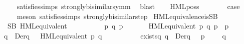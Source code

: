 \begin{isabellebody}
\ \ \ \ \isamarkupfalse%
\ satisfies{\isachardot}{\kern0pt}simps{\isacharparenleft}{\kern0pt}{}{\isacharparenright}{\kern0pt}\ strongly{\isacharunderscore}{\kern0pt}bisimilar{\isacharunderscore}{\kern0pt}symm\ \isamarkupfalse%
\ blast\isanewline
{}\isamarkupfalse%
\isanewline
\ \ \isamarkupfalse%
\ {\isacharparenleft}{\kern0pt}HML{\isacharunderscore}{\kern0pt}poss\ {\isasymalpha}\ {\isasymphi}{\isacharparenright}{\kern0pt}\isanewline
\ \ \isamarkupfalse%
\ \isamarkupfalse%
\ {\isacharquery}{\kern0pt}case\isanewline
\ \ \ \ \isamarkupfalse%
\ {\isacharparenleft}{\kern0pt}meson\ satisfies{\isachardot}{\kern0pt}simps{\isacharparenleft}{\kern0pt}{}{\isacharparenright}{\kern0pt}\ strongly{\isacharunderscore}{\kern0pt}bisimilar{\isacharunderscore}{\kern0pt}step{\isacharparenleft}{\kern0pt}{}{\isacharparenright}{\kern0pt}{\isacharparenright}{\kern0pt}\isanewline
{}\isamarkupfalse%
\isanewline
\isanewline
\isanewline
{}\isamarkupfalse%
\ HML{\isacharunderscore}{\kern0pt}equivalence{\isacharunderscore}{\kern0pt}is{\isacharunderscore}{\kern0pt}SB{\isacharcolon}{\kern0pt}\isanewline
\ \ \ {\isacartoucheopen}SB\ HML{\isacharunderscore}{\kern0pt}equivalent{\isacartoucheclose}\isanewline
{}\isamarkupfalse%
\ {\isacharminus}{\kern0pt}\isanewline
\ \ \isacommand{{\isacharbraceleft}{\kern0pt}}\isamarkupfalse%
\isanewline
\ \ \ \ \isamarkupfalse%
\ p\ q\ p{\isacharprime}{\kern0pt}\ {\isasymalpha}\isanewline
\ \ \ \ \isamarkupfalse%
\ {\isacartoucheopen}HML{\isacharunderscore}{\kern0pt}equivalent\ p\ q{\isacartoucheclose}\ {\isacartoucheopen}p\ {\isasymlongmapsto}{\isasymalpha}\ p{\isacharprime}{\kern0pt}{\isacartoucheclose}\isanewline
\ \ \ \ \isamarkupfalse%
\ {\isacartoucheopen}{\isasymforall}\ q{\isacharprime}{\kern0pt}\ {\isasymin}\ Der{\isacharparenleft}{\kern0pt}q{\isacharcomma}{\kern0pt}\ {\isasymalpha}{\isacharparenright}{\kern0pt}{\isachardot}{\kern0pt}\ {\isasymnot}\ HML{\isacharunderscore}{\kern0pt}equivalent\ p{\isacharprime}{\kern0pt}\ q{\isacharprime}{\kern0pt}{\isacartoucheclose}\isanewline
\ \ \ \ \isanewline
\ \ \ \ \isamarkupfalse%
\ {\isachardoublequoteopen}exists{\isacharunderscore}{\kern0pt}{\isasymphi}\isactrlbsub q{\isacharprime}{\kern0pt}\isactrlesub {\isachardoublequoteclose}{\isacharcolon}{\kern0pt}\ {\isacartoucheopen}{\isasymforall}q{\isacharprime}{\kern0pt}\ {\isasymin}\ Der{\isacharparenleft}{\kern0pt}q{\isacharcomma}{\kern0pt}\ {\isasymalpha}{\isacharparenright}{\kern0pt}{\isachardot}{\kern0pt}\ {\isasymexists}{\isasymphi}{\isachardot}{\kern0pt}\ p{\isacharprime}{\kern0pt}\ {\isasymTurnstile}\ {\isasymphi}\ {\isasymand}\ {\isasymnot}\ q{\isacharprime}{\kern0pt}\ {\isasymTurnstile}\ {\isasymphi}{\isacartoucheclose}\isanewline

\end{isabellebody}
